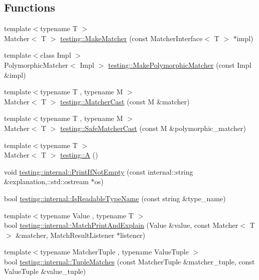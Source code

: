\subsection*{Functions}
\begin{DoxyCompactItemize}
\item 
{\footnotesize template$<$typename T $>$ }\\Matcher$<$ T $>$ \hyperlink{namespacetesting_a37fd8029ac00e60952440a3d9cca8166}{testing\+::\+Make\+Matcher} (const Matcher\+Interface$<$ T $>$ $\ast$impl)
\item 
{\footnotesize template$<$class Impl $>$ }\\Polymorphic\+Matcher$<$ Impl $>$ \hyperlink{namespacetesting_a667ca94f190ec2e17ee2fbfdb7d3da04}{testing\+::\+Make\+Polymorphic\+Matcher} (const Impl \&impl)
\item 
{\footnotesize template$<$typename T , typename M $>$ }\\Matcher$<$ T $>$ \hyperlink{namespacetesting_a8234d15eee99b135a7fdf2141a2ebe1f}{testing\+::\+Matcher\+Cast} (const M \&matcher)
\item 
{\footnotesize template$<$typename T , typename M $>$ }\\Matcher$<$ T $>$ \hyperlink{namespacetesting_ac016ac22aa065a19b9ef95f0ccffc17b}{testing\+::\+Safe\+Matcher\+Cast} (const M \&polymorphic\+\_\+matcher)
\item 
{\footnotesize template$<$typename T $>$ }\\Matcher$<$ T $>$ \hyperlink{namespacetesting_a5e9134d655d2fc9323902348083282e7}{testing\+::A} ()
\item 
void \hyperlink{namespacetesting_1_1internal_a77c9e2b66d2b2414db4763971180d53c}{testing\+::internal\+::\+Print\+If\+Not\+Empty} (const internal\+::string \&explanation,\+::std\+::ostream $\ast$os)
\item 
bool \hyperlink{namespacetesting_1_1internal_a19a5d50382569ce6ee94e2b68ddc6fc7}{testing\+::internal\+::\+Is\+Readable\+Type\+Name} (const string \&type\+\_\+name)
\item 
{\footnotesize template$<$typename Value , typename T $>$ }\\bool \hyperlink{namespacetesting_1_1internal_a0821df2611d54c79bac990719ad8a2dd}{testing\+::internal\+::\+Match\+Print\+And\+Explain} (Value \&value, const Matcher$<$ T $>$ \&matcher, Match\+Result\+Listener $\ast$listener)
\item 
{\footnotesize template$<$typename Matcher\+Tuple , typename Value\+Tuple $>$ }\\bool \hyperlink{namespacetesting_1_1internal_a10095d1e1c99369200072b39d657ebc4}{testing\+::internal\+::\+Tuple\+Matches} (const Matcher\+Tuple \&matcher\+\_\+tuple, const Value\+Tuple \&value\+\_\+tuple)

\end{DoxyCompactItemize}
